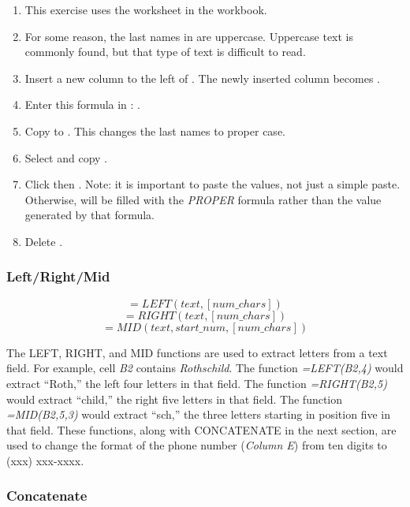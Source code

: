 \begin{enumbox}
	\begin{enumerate}
		\item This exercise uses the  worksheet in the  workbook.
		\item For some reason, the last names in  are uppercase. Uppercase text is commonly found, but that type of text is difficult to read.
		\item Insert a new column to the left of . The newly inserted column becomes .
		\item Enter this formula in : .
		\item Copy  to . This changes the last names to proper case.
		\item Select and copy .
		\item Click  then . Note: it is important to paste the values, not just a simple paste. Otherwise,  will be filled with the \textit{PROPER} formula rather than the value generated by that formula.
		\item Delete .
	\end{enumerate}
\end{enumbox}

\subsubsection{Left/Right/Mid}

\[ =LEFT(text, [num\_chars]) \]
\[ =RIGHT(text, [num\_chars]) \]
\[ =MID(text, start\_num, [num\_chars]) \]

The LEFT, RIGHT, and MID functions are used to extract letters from a text field. For example, cell \textit{B2} contains \textit{Rothschild}. The function \textit{=LEFT(B2,4)} would extract ``Roth,'' the left four letters in that field. The function \textit{=RIGHT(B2,5)} would extract ``child,'' the right five letters in that field. The function \textit{=MID(B2,5,3)} would extract ``sch,'' the three letters starting in position five in that field. These functions, along with CONCATENATE in the next section, are used to change the format of the phone number (\textit{Column E}) from ten digits to (xxx) xxx-xxxx.

\subsubsection{Concatenate}

